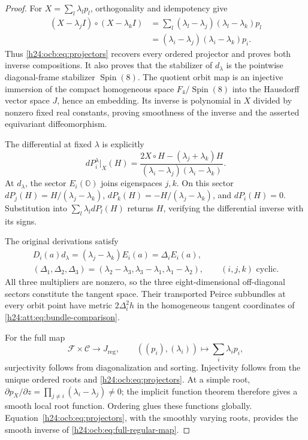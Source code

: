\begin{proof}
For $X=\sum_l\lambda_l p_l$, orthogonality and idempotency give
\[
 \begin{aligned}
 (X-\lambda_jI)\circ(X-\lambda_kI)
 &=\sum_l(\lambda_l-\lambda_j)(\lambda_l-\lambda_k)p_l\\
 &=(\lambda_i-\lambda_j)(\lambda_i-\lambda_k)p_i.
 \end{aligned}
\]
Thus \eqref{h24:ocb:eq:projectors} recovers every ordered projector and
proves both inverse compositions. It also proves that the stabilizer
of $d_\lambda$ is the pointwise diagonal-frame stabilizer
$\operatorname{Spin}(8)$. The quotient orbit map is an injective
immersion of the compact homogeneous space
$F_4/\operatorname{Spin}(8)$ into the Hausdorff vector space $J$,
hence an embedding. Its inverse is polynomial in $X$ divided by
nonzero fixed real constants, proving smoothness of the inverse and
the asserted equivariant diffeomorphism.

The differential at fixed $\lambda$ is explicitly
\begin{equation}
 dP_i^\lambda|_X(H)=
 \frac{2X\circ H-(\lambda_j+\lambda_k)H}
      {(\lambda_i-\lambda_j)(\lambda_i-\lambda_k)}.
 \label{h24:ocb:eq:projector-differential}\tag{OCB9}
\end{equation}
At $d_\lambda$, the sector $E_i(\mathbb O)$ joins eigenspaces $j,k$.
On this sector $dP_j(H)=H/(\lambda_j-\lambda_k)$,
$dP_k(H)=-H/(\lambda_j-\lambda_k)$, and $dP_i(H)=0$.
Substitution into $\sum_l\lambda_l dP_l(H)$ returns $H$, verifying
the differential inverse with its signs.

The original derivations satisfy
\begin{equation}
 \begin{gathered}
 D_i(a)d_\lambda=(\lambda_j-\lambda_k)E_i(a)=\Delta_i E_i(a),\\
 (\Delta_1,\Delta_2,\Delta_3)=
 (\lambda_2-\lambda_3,\lambda_3-\lambda_1,\lambda_1-\lambda_2),
 \qquad(i,j,k)\text{ cyclic}.
 \end{gathered}
 \label{h24:ocb:eq:tangent-multipliers}\tag{OCB10}
\end{equation}
All three multipliers are nonzero, so the three eight-dimensional
off-diagonal sectors constitute the tangent space. Their transported
Peirce subbundles at every orbit point have metric $2\Delta_i^2h$
in the homogeneous tangent coordinates of
\eqref{h24:att:eq:bundle-comparison}.

For the full map
\begin{equation}
 \mathcal F\times\mathcal C\longrightarrow J_{\mathrm{reg}},
 \qquad ((p_i),(\lambda_i))\longmapsto\sum_i\lambda_i p_i,
 \label{h24:ocb:eq:full-regular-map}\tag{OCB11}
\end{equation}
surjectivity follows from diagonalization and sorting. Injectivity
follows from the unique ordered roots and \eqref{h24:ocb:eq:projectors}.
At a simple root,
$\partial p_X/\partial z=\prod_{j\ne i}(\lambda_i-\lambda_j)\ne0$;
the implicit function theorem therefore gives a smooth local root
function. Ordering glues these functions globally.
Equation~\eqref{h24:ocb:eq:projectors}, with the smoothly varying roots,
provides the smooth inverse of \eqref{h24:ocb:eq:full-regular-map}.
\end{proof}

